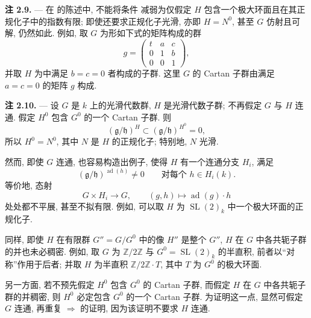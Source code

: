 \medskip
\noindent{}\textbf{注 2.9.} ---
在  的陈述中, 不能将条件  减弱为仅假定 \(H\) 包含一个极大环面且在其正规化子中的指数有限; 即使还要求正规化子光滑, 亦即 \(H=N^0\), 甚至 \(G\) 仿射且可解, 仍然如此. 例如, 取 \(G\) 为形如下式的矩阵构成的群
\[
  g=
  \begin{pmatrix}
    t & a & c\\
    0 & 1 & b\\
    0 & 0 & 1
  \end{pmatrix},
\]
并取 \(H\) 为中满足 \(b=c=0\) 者构成的子群. 这里 \(G\) 的 Cartan 子群由满足 \(a=c=0\) 的矩阵 \(g\) 构成.

\medskip
\noindent{}\textbf{注 2.10.} ---
设 \(G\) 是 \(k\) 上的光滑代数群, \(H\) 是光滑代数子群; 不再假定 \(G\) 与 \(H\) 连通. 假定 \(H^0\) 包含 \(G^0\) 的一个 Cartan 子群. 则
\[
  (\mathfrak g/\mathfrak h)^H
  \subset(\mathfrak g/\mathfrak h)^{H^0}=0,
\]
所以 \(H^0=N^0\), 其中 \(N\) 是 \(H\) 的正规化子; 特别地, \(N\) 光滑.

然而, 即使 \(G\) 连通, 也容易构造出例子, 使得 \(H\) 有一个连通分支 \(H_i\), 满足
\[
  (\mathfrak g/\mathfrak h)^{\operatorname{ad}(h)}\neq0
  \qquad\text{对每个 }h\in H_i(k).
\]
等价地, 态射
\[
  G\times H_i\longrightarrow G,\qquad
  (g,h)\longmapsto\operatorname{ad}(g)\cdot h
\]
处处都不平展, 甚至不拟有限. 例如, 可以取 \(H\) 为 \(\operatorname{SL}(2)_k\) 中一个极大环面的正规化子.

同样, 即使 \(H\) 在有限群 \(G''=G/G^0\) 中的像 \(H''\) 是整个 \(G''\), \(H\) 在 \(G\) 中各共轭子群的并也未必稠密. 例如, 取 \(G\) 为 \(\mathbb Z/2\mathbb Z\) 与 \(G^0=\operatorname{SL}(2)_k\) 的半直积, 前者以“对称”作用于后者; 并取 \(H\) 为半直积 \(\mathbb Z/2\mathbb Z\cdot T\), 其中 \(T\) 为 \(G^0\) 的极大环面.

另一方面, 若不预先假定 \(H^0\) 包含 \(G^0\) 的 Cartan 子群, 而假定 \(H\) 在 \(G\) 中各共轭子群的并稠密, 则 \(H^0\) 必定包含 \(G^0\) 的一个 Cartan 子群. 为证明这一点, 显然可假定 \(G\) 连通, 再重复  \(\Rightarrow\)  的证明, 因为该证明不要求 \(H\) 连通.



